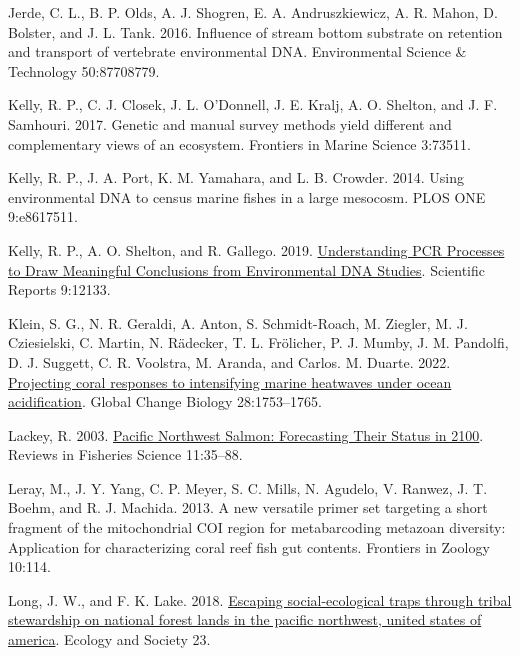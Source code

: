\documentclass[
]{article}
\newlength{\cslhangindent}
\newlength{\cslentryspacingunit} %
\newenvironment{CSLReferences}[2] %
 {%
  \setlength{\parindent}{0pt}
  \ifodd #1
  \let\oldpar\par
  \def\par{\hangindent=\cslhangindent\oldpar}
  \fi
  \setlength{\parskip}{#2\cslentryspacingunit}
 }%
 {}
\begin{document}
\begin{CSLReferences}{1}{0}
\leavevmode{}%
Jerde, C. L., B. P. Olds, A. J. Shogren, E. A. Andruszkiewicz, A. R.
Mahon, D. Bolster, and J. L. Tank. 2016. Influence of stream bottom
substrate on retention and transport of vertebrate environmental DNA.
Environmental Science \& Technology 50:87708779.

\leavevmode{}%
Kelly, R. P., C. J. Closek, J. L. O'Donnell, J. E. Kralj, A. O. Shelton,
and J. F. Samhouri. 2017. Genetic and manual survey methods yield
different and complementary views of an ecosystem. Frontiers in Marine
Science 3:73511.

\leavevmode{}%
Kelly, R. P., J. A. Port, K. M. Yamahara, and L. B. Crowder. 2014. Using
environmental DNA to census marine fishes in a large mesocosm. PLOS ONE
9:e8617511.

\leavevmode{}%
Kelly, R. P., A. O. Shelton, and R. Gallego. 2019.
\href{https://doi.org/10.1038/s41598-019-48546-x}{Understanding PCR
Processes to Draw Meaningful Conclusions from Environmental DNA
Studies}. Scientific Reports 9:12133.

\leavevmode{}%
Klein, S. G., N. R. Geraldi, A. Anton, S. Schmidt-Roach, M. Ziegler, M.
J. Cziesielski, C. Martin, N. Rädecker, T. L. Frölicher, P. J. Mumby, J.
M. Pandolfi, D. J. Suggett, C. R. Voolstra, M. Aranda, and Carlos. M.
Duarte. 2022. \href{https://doi.org/10.1111/gcb.15818}{Projecting coral
responses to intensifying marine heatwaves under ocean acidification}.
Global Change Biology 28:1753--1765.

\leavevmode{}%
Lackey, R. 2003.
\href{https://doi.org/10.1080/16226510390856529}{Pacific Northwest
Salmon: Forecasting Their Status in 2100}. Reviews in Fisheries Science
11:35--88.

\leavevmode{}%
Leray, M., J. Y. Yang, C. P. Meyer, S. C. Mills, N. Agudelo, V. Ranwez,
J. T. Boehm, and R. J. Machida. 2013. A new versatile primer set
targeting a short fragment of the mitochondrial COI region for
metabarcoding metazoan diversity: Application for characterizing coral
reef fish gut contents. Frontiers in Zoology 10:114.

\leavevmode{}%
Long, J. W., and F. K. Lake. 2018.
\href{https://www.jstor.org/stable/26799109}{Escaping social-ecological
traps through tribal stewardship on national forest lands in the pacific
northwest, united states of america}. Ecology and Society 23.


\end{CSLReferences}
\end{document}
